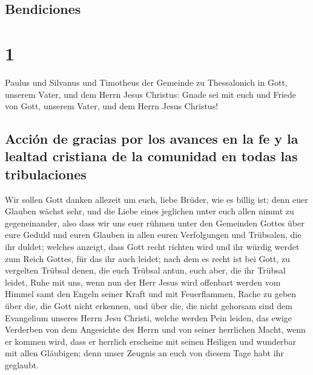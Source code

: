 \hypertarget{bendiciones}{%
\subsection{Bendiciones}\label{bendiciones}}

\hypertarget{section}{%
\section{1}\label{section}}

 Paulus und Silvanus und Timotheus der Gemeinde zu
Thessalonich in Gott, unserem Vater, und dem Herrn Jesus Christus:
 Gnade sei mit euch und Friede von Gott, unserem Vater,
und dem Herrn Jesus Christus!

\hypertarget{acciuxf3n-de-gracias-por-los-avances-en-la-fe-y-la-lealtad-cristiana-de-la-comunidad-en-todas-las-tribulaciones}{%
\subsection{Acción de gracias por los avances en la fe y la lealtad
cristiana de la comunidad en todas las
tribulaciones}\label{acciuxf3n-de-gracias-por-los-avances-en-la-fe-y-la-lealtad-cristiana-de-la-comunidad-en-todas-las-tribulaciones}}

 Wir sollen Gott danken allezeit um euch, liebe Brüder,
wie es billig ist; denn euer Glauben wächst sehr, und die Liebe eines
jeglichen unter euch allen nimmt zu gegeneinander,  also
dass wir uns euer rühmen unter den Gemeinden Gottes über eure Geduld und
euren Glauben in allen euren Verfolgungen und Trübsalen, die ihr duldet;
 welches anzeigt, dass Gott recht richten wird und ihr
würdig werdet zum Reich Gottes, für das ihr auch leidet; 
nach dem es recht ist bei Gott, zu vergelten Trübsal denen, die euch
Trübsal antun,  euch aber, die ihr Trübsal leidet, Ruhe
mit uns, wenn nun der Herr Jesus wird offenbart werden vom Himmel samt
den Engeln seiner Kraft  und mit Feuerflammen, Rache zu
geben über die, die Gott nicht erkennen, und über die, die nicht
gehorsam sind dem Evangelium unseres Herrn Jesu Christi, 
welche werden Pein leiden, das ewige Verderben von dem Angesichte des
Herrn und von seiner herrlichen Macht,  wenn er kommen
wird, dass er herrlich erscheine mit seinen Heiligen und wunderbar mit
allen Gläubigen; denn unser Zeugnis an euch von diesem Tage habt ihr
geglaubt.

